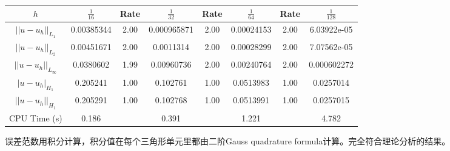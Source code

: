 \documentclass[lang=cn,11pt,a4paper]{elegantpaper}
\begin{document}
\begin{table}[H]
    \centering
    \begin{tabular}{|c|c|c|c|c|c|c|c|}
    \hline
    $h$                    & $\frac{1}{16}$ & Rate & $\frac{1}{32}$ & Rate & $\frac{1}{64}$ & Rate & $\frac{1}{128}$ \\ \hline
    $||u-u_h||_{L_1}$      & 0.00385344     & 2.00 & 0.000965871    & 2.00 & 0.00024153     & 2.00 & 6.03922e-05     \\ \hline
    $||u-u_h||_{L_2}$      & 0.00451671     & 2.00 & 0.0011314      & 2.00 & 0.00028299     & 2.00 & 7.07562e-05     \\ \hline
    $||u-u_h||_{L_\infty}$ & 0.0380602      & 1.99 & 0.00960736     & 2.00 & 0.00240764     & 2.00 & 0.000602272     \\ \hline
    $|u-u_h|_{H_1}$        & 0.205241       & 1.00 & 0.102761       & 1.00 & 0.0513983      & 1.00 & 0.0257014       \\ \hline
    $||u-u_h||_{H_1}$      & 0.205291       & 1.00 & 0.102768       & 1.00 & 0.0513991      & 1.00 & 0.0257015       \\ \hline
    CPU Time (s)           & 0.186          &      & 0.391          &      & 1.221          &      & 4.782           \\ \hline
    \end{tabular}
\end{table}

误差范数用积分计算，积分值在每个三角形单元里都由二阶Gauss quadrature formula计算。完全符合理论分析的结果。

\appendix
\addappheadtotoc
\end{document}
